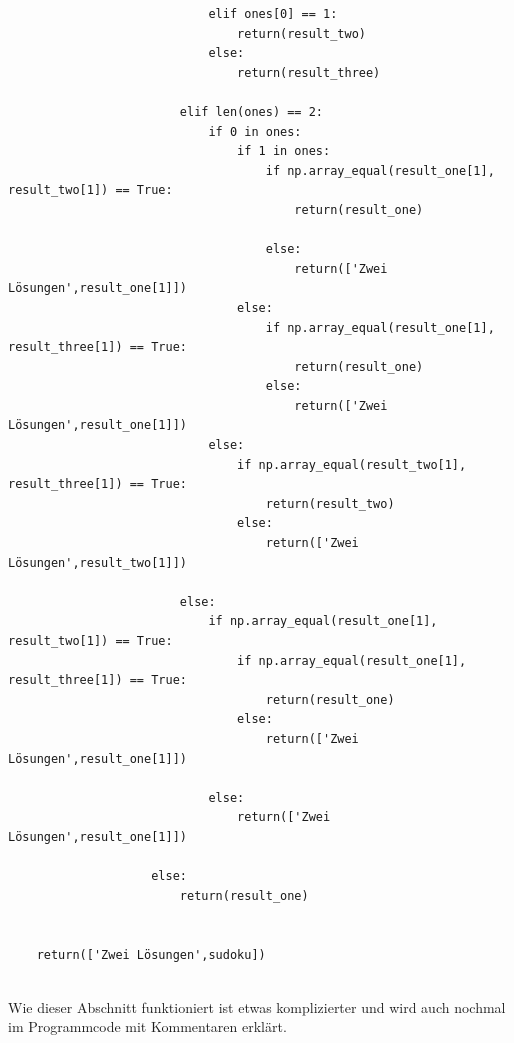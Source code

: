 \documentclass[11pt,a4paper]{article}
\begin{document}
\begin{verbatim}
                            elif ones[0] == 1:                                
                                return(result_two)                            
                            else:                                             
                                return(result_three)
                                
                        elif len(ones) == 2:
                            if 0 in ones:
                                if 1 in ones:
                                    if np.array_equal(result_one[1], result_two[1]) == True:
                                        return(result_one)
                                    
                                    else:
                                        return(['Zwei Lösungen',result_one[1]])
                                else:
                                    if np.array_equal(result_one[1], result_three[1]) == True:
                                        return(result_one)
                                    else:
                                        return(['Zwei Lösungen',result_one[1]])
                            else:
                                if np.array_equal(result_two[1], result_three[1]) == True:
                                    return(result_two)
                                else:
                                    return(['Zwei Lösungen',result_two[1]])
                                        
                        else:
                            if np.array_equal(result_one[1], result_two[1]) == True:
                                if np.array_equal(result_one[1], result_three[1]) == True:
                                    return(result_one)
                                else:
                                    return(['Zwei Lösungen',result_one[1]])
                                        
                            else:
                                return(['Zwei Lösungen',result_one[1]])
                                    
                    else: 
                        return(result_one)
                            
                            
    return(['Zwei Lösungen',sudoku])  
\end{verbatim}
\ \\
Wie dieser Abschnitt funktioniert ist etwas komplizierter und wird auch nochmal im Programmcode mit Kommentaren erklärt.
\end{document}
